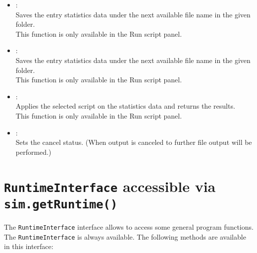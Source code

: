 \begin{itemize}

\item
{}:\\
Saves the entry statistics data under the next available file name in the given folder.\\
This function is only available in the Run script panel.

\item
{}:\\
Saves the entry statistics data under the next available file name in the given folder.\\
This function is only available in the Run script panel.

\item
{}:\\
Applies the selected script on the statistics data and returns the results.\\
This function is only available in the Run script panel.

\item
{}:\\
Sets the cancel status. (When output is canceled to further file output will be performed.)

\end{itemize}



\chapter{\texttt{RuntimeInterface} accessible via \texttt{sim.getRuntime()}}

The \texttt{RuntimeInterface} interface allows to access some general program functions.\\
The \texttt{RuntimeInterface} is always available. The following methods are available in this interface:

